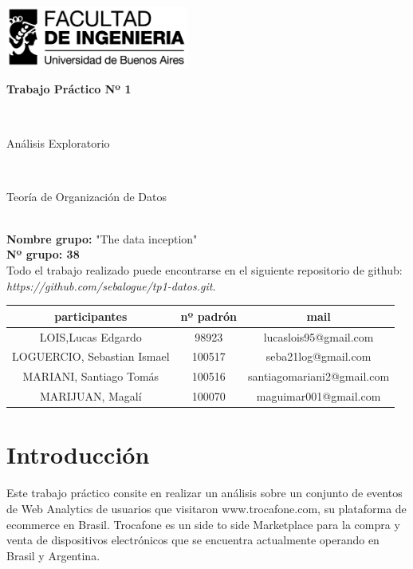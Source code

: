 \documentclass[titlepage,a4paper]{article}
\begin{document}
	\begin{titlepage}
		\hfill\includegraphics[width=6cm]{logofiuba.jpg}
		\center
		\vfill
		\vfill
		\begin{center}
			\begin{Huge}\textbf{Trabajo Práctico Nº 1}\end{Huge}\\
			\vfill
			\begin{huge}Análisis Exploratorio\end{huge}\\
			\vfill
			\begin{Large} Teoría de Organización de Datos\end{Large}\\

			\textbf{Nombre grupo:} "The data inception" \\
			\textbf{Nº grupo: 38}\\
				Todo el trabajo realizado puede encontrarse en el siguiente repositorio de github:\textit{ https://github.com/sebalogue/tp1-datos.git. }
	
			\vfill
			\begin{tabular}{|c|c|c|}
				\hline
				participantes & nº padrón & mail \\ \hline
				LOIS,Lucas Edgardo & 98923 & lucaslois95@gmail.com \\ \hline		
				LOGUERCIO, Sebastian Ismael &100517 & seba21log@gmail.com \\ \hline
				MARIANI, Santiago Tomás &100516 &  santiagomariani2@gmail.com \\ \hline
				MARIJUAN, Magalí & 100070 & maguimar001@gmail.com\\ \hline
				
			\end{tabular}
			\vfill
			\vfill
			\vfill
			\vfill
			\vfill
			\vfill
		\end{center}
	
	\end{titlepage}

	\tableofcontents
	\newpage
	
	\section{Introducción}
	Este trabajo práctico consite en realizar un análisis sobre un conjunto de eventos de Web Analytics de usuarios que visitaron www.trocafone.com, su plataforma de ecommerce en Brasil. Trocafone es un side to side Marketplace para la compra y venta de dispositivos electrónicos que se encuentra actualmente operando en Brasil y Argentina.
	
\end{document}
